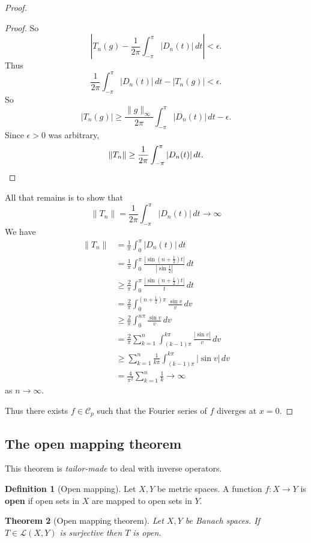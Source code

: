 \documentclass[10pt, oneside, reqno]{amsart}
\theoremstyle{plain}%
\newtheorem{thm}{Theorem}[section]
\theoremstyle{definition}
\newtheorem{defn}[thm]{Definition}
\theoremstyle{remark}
\begin{document}
\begin{proof}
\begin{proof}
	  So \[
		\left| T_n(g) - \frac{1}{2\pi} \int_{-\pi}^\pi |D_n(t)| \, dt \right| < \epsilon.
	\]  Thus \[
		\frac{1}{2\pi} \int_{-\pi}^\pi |D_n(t) | \, dt - |T_n(g)| < \epsilon.  
	\]  So \[
		|T_n(g)| \geq \frac{\| g \|_\infty}{2 \pi} \int_{-\pi}^\pi |D_n(t)| \, dt - \epsilon. 
	\]  Since $\epsilon > 0$ was arbitrary, \[
		\|T_n \| \geq \frac{1}{2 \pi} \int_{-\pi}^\pi |D_n(t) | \, dt. \qedhere
	\]
\end{proof}

All that remains is to show that \[
	\|T_n \| = \frac{1}{2\pi} \int_{-\pi}^\pi |D_n(t)| \, dt \rightarrow \infty
\]  We have 
\begin{align*}
	\|T_n \| 	&= \frac{1}{\pi}\int_0^\pi |D_n(t) | \, dt \\
				&= \frac{1}{\pi} \int_0^\pi \frac{|\sin(n+\frac{1}{2})t|}{|\sin \frac{t}{2}|} \, dt \\
				&\geq \frac{2}{\pi} \int_0^\pi \frac{|\sin(n+\frac{1}{2}) t |}{t} \, dt \\
				&= \frac{2}{\pi} \int_0^{(n+\frac{1}{2})\pi} \frac{\sin v}{v} \, dv \\
				&\geq \frac{2}{\pi} \int_0^{n\pi} \frac{\sin v}{v} \, dv \\
				&= \frac{2}{\pi} \sum_{k=1}^n \int_{(k-1)\pi}^{k \pi} \frac{|\sin v|}{v} \, dv \\
				&\geq \sum_{k=1}^n \frac{1}{k \pi} \int_{(k-1)\pi}^{k \pi} |\sin v | \, dv \\
				&= \frac{4}{\pi^2} \sum_{k =1 }^n \frac{1}{k} \rightarrow \infty
\end{align*} as $n \rightarrow \infty$.  

Thus there exists $f \in \mathcal C_p$ such that the Fourier series of $f$ diverges at $x = 0$.  
\end{proof}

\subsection{The open mapping theorem} %
\label{sub:the_open_mapping_theorem}
This theorem is \emph{tailor-made} to deal with inverse operators.

\begin{defn}[Open mapping]
	Let $X, Y$ be metric spaces.  A function $f : X \rightarrow Y$ is \textbf{open} if open sets in $X$ are mapped to open sets in $Y$.  
\end{defn}

\begin{thm}[Open mapping theorem]
	Let $X, Y$ be Banach spaces.  If $T \in \mathcal{L}(X,Y)$ is surjective then $T$ is open. 
\end{thm}
\end{document}
